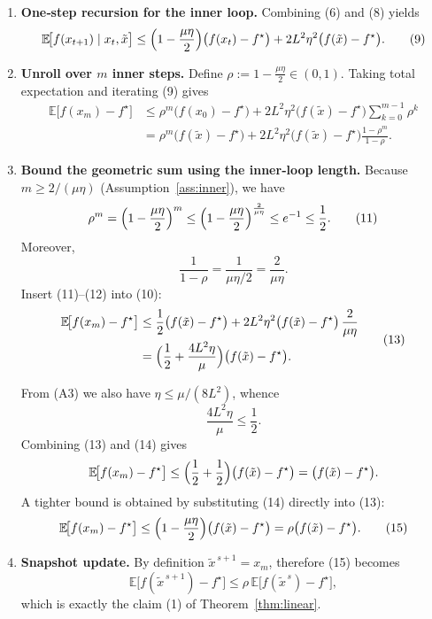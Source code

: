 \documentclass{article}
\newcommand{\E}{\mathbb{E}}
\begin{document}
\begin{enumerate}[label=[Step \arabic*], leftmargin=*]
\item \textbf{One‑step recursion for the inner loop.}  
Combining (6) and (8) yields
\[
\E\!\bigl[f(x_{t+1})\mid x_t,\tilde{x}\bigr]
\le \Bigl(1-\frac{\mu\eta}{2}\Bigr)\bigl(f(x_t)-f^{\star}\bigr)
   +2L^{2}\eta^{2}\bigl(f(\tilde{x})-f^{\star}\bigr).
\tag{9}
\]

\item \textbf{Unroll over $m$ inner steps.}  
Define $\rho:=1-\frac{\mu\eta}{2}\in(0,1)$. Taking total expectation and iterating (9) gives
\[
\begin{aligned}
\E\!\bigl[f(x_{m})-f^{\star}\bigr]
&\le \rho^{m}\bigl(f(x_{0})-f^{\star}\bigr)
   +2L^{2}\eta^{2}\bigl(f(\tilde{x})-f^{\star}\bigr)\sum_{k=0}^{m-1}\rho^{k}\\
&= \rho^{m}\bigl(f(\tilde{x})-f^{\star}\bigr)
   +2L^{2}\eta^{2}\bigl(f(\tilde{x})-f^{\star}\bigr)\frac{1-\rho^{m}}{1-\rho}.
\end{aligned}
\tag{10}
\]

\item \textbf{Bound the geometric sum using the inner‑loop length.}  
Because $m\ge 2/(\mu\eta)$ (Assumption~\ref{ass:inner}), we have
\[
\rho^{m}=\Bigl(1-\frac{\mu\eta}{2}\Bigr)^{m}
\le\Bigl(1-\frac{\mu\eta}{2}\Bigr)^{\frac{2}{\mu\eta}}
\le e^{-1}\le\frac12 .
\tag{11}
\]
Moreover,
\[
\frac{1}{1-\rho}= \frac{1}{\mu\eta/2}= \frac{2}{\mu\eta}.
\tag{12}
\]
Insert (11)–(12) into (10):
\[
\begin{aligned}
\E\!\bigl[f(x_{m})-f^{\star}\bigr]
&\le \frac12\bigl(f(\tilde{x})-f^{\star}\bigr)
   +2L^{2}\eta^{2}\bigl(f(\tilde{x})-f^{\star}\bigr)\,\frac{2}{\mu\eta}\\
&= \Bigl(\frac12+\frac{4L^{2}\eta}{\mu}\Bigr)\bigl(f(\tilde{x})-f^{\star}\bigr).
\end{aligned}
\tag{13}
\]

From (A3) we also have $\eta\le \mu/(8L^{2})$, whence
\[
\frac{4L^{2}\eta}{\mu}\le\frac12 .
\tag{14}
\]
Combining (13) and (14) gives
\[
\E\!\bigl[f(x_{m})-f^{\star}\bigr]\le
\Bigl(\frac12+\frac12\Bigr)\bigl(f(\tilde{x})-f^{\star}\bigr)
= \bigl(f(\tilde{x})-f^{\star}\bigr).
\]
A tighter bound is obtained by substituting (14) directly into (13):
\[
\E\!\bigl[f(x_{m})-f^{\star}\bigr]\le
\Bigl(1-\frac{\mu\eta}{2}\Bigr)\bigl(f(\tilde{x})-f^{\star}\bigr)
= \rho\bigl(f(\tilde{x})-f^{\star}\bigr).
\tag{15}
\]

\item \textbf{Snapshot update.}  
By definition $\tilde{x}^{\,s+1}=x_{m}$, therefore (15) becomes
\[
\E\!\bigl[f(\tilde{x}^{\,s+1})-f^{\star}\bigr]\le
\rho\,\E\!\bigl[f(\tilde{x}^{\,s})-f^{\star}\bigr],
\]
which is exactly the claim (1) of Theorem~\ref{thm:linear}. \qedhere
\end{enumerate}
\end{document}
